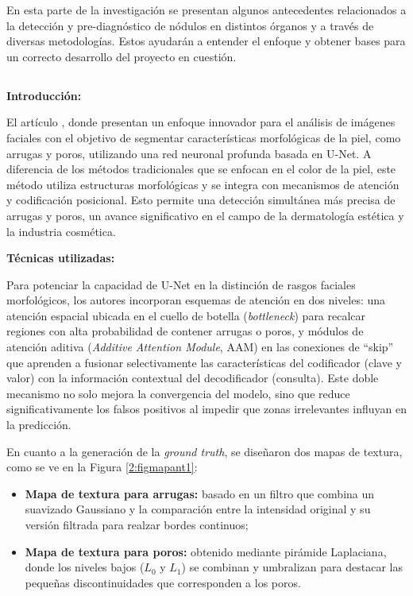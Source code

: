 En esta parte de la investigación se presentan algunos antecedentes relacionados a la detección y pre-diagnóstico de nódulos en distintos órganos y a través de diversas metodologías. Estos ayudarán a entender el enfoque y obtener bases para un correcto desarrollo del proyecto en cuestión.

\subsection{}

\textbf{Introducción:}

El artículo , donde \cite{yoon2023} presentan un enfoque innovador para el análisis de imágenes faciales con el objetivo de segmentar características morfológicas de la piel, como arrugas y poros, utilizando una red neuronal profunda basada en U-Net. A diferencia de los métodos tradicionales que se enfocan en el color de la piel, este método utiliza estructuras morfológicas y se integra con mecanismos de atención y codificación posicional. Esto permite una detección simultánea más precisa de arrugas y poros, un avance significativo en el campo de la dermatología estética y la industria cosmética.

\textbf{Técnicas utilizadas:}

Para potenciar la capacidad de U-Net en la distinción de rasgos faciales morfológicos, los autores incorporan esquemas de atención en dos niveles: una atención espacial ubicada en el cuello de botella (\textit{bottleneck}) para recalcar regiones con alta probabilidad de contener arrugas o poros, y módulos de atención aditiva (\textit{Additive Attention Module}, AAM) en las conexiones de “skip” que aprenden a fusionar selectivamente las características del codificador (clave y valor) con la información contextual del decodificador (consulta). Este doble mecanismo no solo mejora la convergencia del modelo, sino que reduce significativamente los falsos positivos al impedir que zonas irrelevantes influyan en la predicción.

En cuanto a la generación de la \textit{ground truth}, se diseñaron dos mapas de textura, como se ve en la Figura \ref{2:figmapant1}:

\begin{itemize}
    \item \textbf{Mapa de textura para arrugas:} basado en un filtro que combina un suavizado Gaussiano y la comparación entre la intensidad original y su versión filtrada para realzar bordes continuos;
    \item \textbf{Mapa de textura para poros:} obtenido mediante pirámide Laplaciana, donde los niveles bajos ($L_0$ y $L_1$) se combinan y umbralizan para destacar las pequeñas discontinuidades que corresponden a los poros.
\end{itemize}

